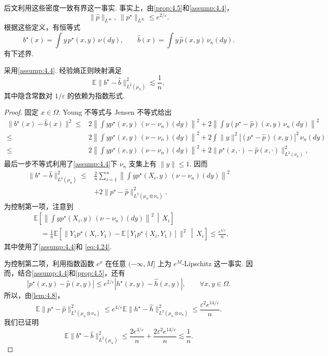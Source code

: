 后文利用这些密度一致有界这一事实. 事实上，由\autoref{prop:4.5}和\autoref{assump:4.4}，
\begin{equation}\label{eq:4.24}
\|\widehat p\|_{L^\infty},\ \|p^\star\|_{L^\infty}\le e^{2/\varepsilon}.
\end{equation}
根据这些定义，有恒等式
$$b^\star(x)=\int y\,p^\star(x,y)\,\nu(dy),\qquad
\widehat b(x)=\int y\,\widehat p(x,y)\,\nu_n(dy).$$
有下述界.
\begin{theorem}\label{thm:4.10}
采用\autoref{assump:4.4}. 经验熵正则映射满足
$$\mathbb E\|b^\star-\widehat b\|_{L^2(\mu_n)}^2\lesssim\frac1n,$$
其中隐含常数对 $1/\varepsilon$ 的依赖为指数形式.
\end{theorem}
\begin{proof}
固定 $x\in\Omega$. Young 不等式与 Jensen 不等式给出
$$\begin{aligned}
\|b^\star(x)-\widehat b(x)\|^2
\le{}&2\left\|\int yp^\star(x,y)\,(\nu-\nu_n)(dy)\right\|^2
+2\left\|\int y(p^\star-\widehat p)(x,y)\,\nu_n(dy)\right\|^2\\
\le{}&2\left\|\int yp^\star(x,y)\,(\nu-\nu_n)(dy)\right\|^2
+2\int\|y\|^2|(p^\star-\widehat p)(x,y)|^2\,\nu_n(dy)\\
\le{}&2\left\|\int yp^\star(x,y)\,(\nu-\nu_n)(dy)\right\|^2
+2\|p^\star(x,\cdot)-\widehat p(x,\cdot)\|_{L^2(\nu_n)}^2,
\end{aligned}$$
最后一步不等式利用了\autoref{assump:4.4}下 $\nu_n$ 支集上有 $\|y\|\le1$. 因而
$$\begin{aligned}
\|b^\star-\widehat b\|_{L^2(\mu_n)}^2
\le{}&\frac2n\sum_{i=1}^n\left\|\int yp^\star(X_i,y)\,(\nu-\nu_n)(dy)\right\|^2\\
&+2\|p^\star-\widehat p\|_{L^2(\mu_n\otimes\nu_n)}^2.
\end{aligned}$$
为控制第一项，注意到
$$\begin{aligned}
&\mathbb E\left[\left\|\int yp^\star(X_i,y)\,(\nu-\nu_n)(dy)\right\|^2\,\middle|\,X_i\right]\\
&\quad=\frac1n\mathbb E\left[\|Y_1p^\star(X_i,Y_1)
-\mathbb E[Y_1p^\star(X_i,Y_1)]\|^2\,\middle|\,X_i\right]\le\frac{e^{4/\varepsilon}}n,
\end{aligned}$$
其中使用了\autoref{assump:4.4}和 \eqref{eq:4.24}.

为控制第二项，利用指数函数 $e^x$ 在任意 $(-\infty,M]$ 上为 $e^M$-Lipschitz 这一事实. 因而，结合\autoref{assump:4.4}和\autoref{prop:4.5}，还有
$$|p^\star(x,y)-\widehat p(x,y)|\le e^{2/\varepsilon}|h^\star(x,y)-\widehat h(x,y)|,
\qquad\forall x,y\in\Omega.$$
所以，由\autoref{lem:4.8}，
$$\mathbb E\|p^\star-\widehat p\|_{L^2(\mu_n\otimes\nu_n)}^2
\le e^{4/\varepsilon}\mathbb E\|h^\star-\widehat h\|_{L^2(\mu_n\otimes\nu_n)}^2
\le\frac{\varepsilon^2e^{14/\varepsilon}}n.$$
我们已证明
$$\mathbb E\|b^\star-\widehat b\|_{L^2(\mu_n)}^2
\le\frac{2e^{4/\varepsilon}}n+\frac{2\varepsilon^2e^{14/\varepsilon}}n\lesssim\frac1n.$$
\end{proof}

